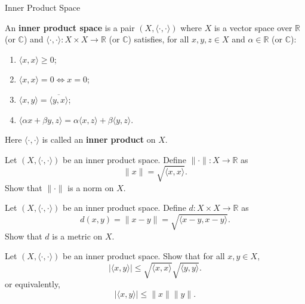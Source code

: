\documentclass[12pt, a4paper]{article}
\begin{document}
\clearpage

\begin{heading}
    Inner Product Space
\end{heading}

\vspace{10pt}

\begin{definition}
    An \textbf{inner product space} is a pair $(X,\langle\cdot,\cdot\rangle)$ where
    $X$ is a vector space over $\mathbb{R}$ (or $\mathbb{C}$) and
    $\langle\cdot,\cdot\rangle:X\times X\to\mathbb{R}$ (or $\mathbb{C}$) satisfies,
    for all $x,y,z\in X$ and $\alpha\in\mathbb{R}$ (or $\mathbb{C}$):
    \begin{enumerate}[label=(IP\arabic*)]
    \item $\langle x,x\rangle\ge 0$;
    \item $\langle x,x\rangle=0 \iff x=0$;
    \item $\langle x,y\rangle=\overline{\langle y,x\rangle}$;
    \item $\langle \alpha x+ \beta y,z\rangle=\alpha\langle x,z\rangle+ \beta \langle y,z\rangle$.
    \end{enumerate}
    Here $\langle\cdot,\cdot\rangle$ is called an \textbf{inner product} on $X$.
\end{definition}

\clearpage

\begin{theorem}
    Let $(X,\langle\cdot,\cdot\rangle)$ be an inner product space. Define
    $\|\cdot\|:X\to\mathbb{R}$ as
    \[
        \|x\|=\sqrt{\langle x,x\rangle}.
    \]
    Show that $\|\cdot\|$ is a norm on $X$.
\end{theorem}

\clearpage

\begin{theorem}
    Let $(X,\langle\cdot,\cdot\rangle)$ be an inner product space. Define
    $d:X\times X\to\mathbb{R}$ as
    \[
        d(x,y)=\|x-y\|=\sqrt{\langle x-y,x-y\rangle}.
    \]
    Show that $d$ is a metric on $X$.
    
\end{theorem}

\clearpage

\begin{theorem}
    Let $(X,\langle\cdot,\cdot\rangle)$ be an inner product space. Show that for all
    $x,y\in X$,
    \[
        |\langle x,y\rangle|\le \sqrt{\langle x,x\rangle}\sqrt{\langle y,y\rangle}.
    \]
    or equivalently,
    \[
        |\langle x,y\rangle|\le \|x\|\|y\|.
    \]
\end{theorem}





\EndPage
\end{document}
